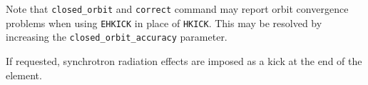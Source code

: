 Note that \verb|closed_orbit| and \verb|correct| command may report orbit convergence problems 
when using \verb|EHKICK| in place of \verb|HKICK|. This may be resolved by increasing the
\verb|closed_orbit_accuracy| parameter.

If requested, synchrotron radiation effects are imposed as a kick at the end of the element.
